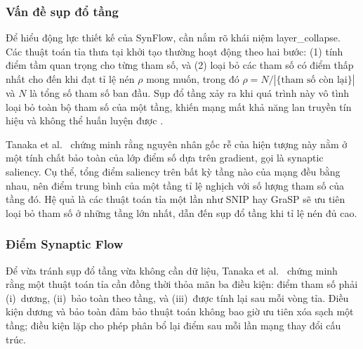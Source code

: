 \subsubsection{Vấn đề sụp đổ tầng}
\label{subsubsec:synflow_layercollapse}
 
Để hiểu động lực thiết kế của SynFlow, cần nắm rõ khái niệm \gls{layer_collapse}. Các thuật toán tỉa thưa tại khởi tạo thường
hoạt động theo hai bước: (1) tính điểm tầm quan trọng cho từng tham số, và
(2) loại bỏ các tham số có điểm thấp nhất cho đến khi đạt tỉ lệ nén
$\rho$ mong muốn, trong đó $\rho = N / |\{\text{tham số còn lại}\}|$ và $N$
là tổng số tham số ban đầu. Sụp đổ tầng xảy ra khi quá trình này vô tình loại
bỏ toàn bộ tham số của một tầng, khiến mạng mất khả năng lan truyền
tín hiệu và không thể huấn luyện được \cite{synflow}.
 
Tanaka et al.\ \cite{synflow} chứng minh rằng nguyên nhân gốc rễ của
hiện tượng này nằm ở một tính chất bảo toàn của lớp điểm số dựa trên gradient,
gọi là synaptic saliency. Cụ thể, tổng điểm saliency trên bất kỳ tầng
nào của mạng đều bằng nhau, nên điểm trung bình của một tầng tỉ lệ
nghịch với số lượng tham số của tầng đó. Hệ quả là các thuật toán tỉa một lần
như SNIP \cite{lee2018snip} hay GraSP \cite{grasp} sẽ ưu tiên
loại bỏ tham số ở những tầng lớn nhất, dẫn đến sụp đổ tầng khi tỉ lệ
nén đủ cao.

\subsubsection{Điểm Synaptic Flow}
\label{subsubsec:synflow_score}
 
Để vừa tránh sụp đổ tầng vừa không cần dữ liệu, Tanaka et al.\
\cite{synflow} chứng minh rằng một thuật toán tỉa cần đồng thời thỏa
mãn ba điều kiện: điểm tham số phải (i)~dương, (ii)~bảo toàn
theo tầng, và (iii)~được tính lại sau mỗi vòng tỉa. Điều kiện dương
và bảo toàn đảm bảo thuật toán không bao giờ ưu tiên xóa sạch một tầng; điều
kiện lặp cho phép phân bổ lại điểm sau mỗi lần mạng thay đổi cấu trúc.
 
